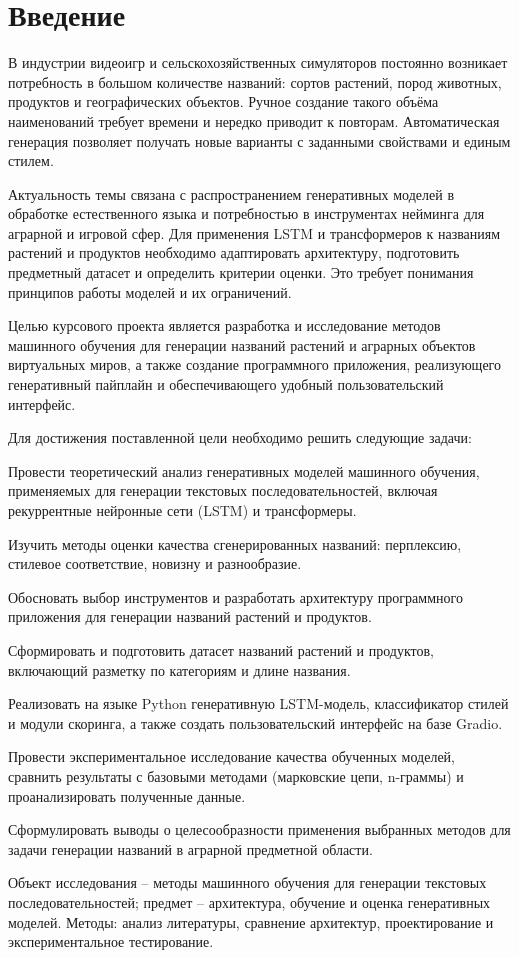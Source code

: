 \chapter*{Введение}\label{ux432ux432ux435ux434ux435ux43dux438ux435}

В индустрии видеоигр и сельскохозяйственных симуляторов постоянно возникает потребность в большом количестве названий: сортов растений, пород животных, продуктов и географических объектов. Ручное создание такого объёма наименований требует времени и нередко приводит к повторам. Автоматическая генерация позволяет получать новые варианты с заданными свойствами и единым стилем.

Актуальность темы связана с распространением генеративных моделей в обработке естественного языка и потребностью в инструментах нейминга для аграрной и игровой сфер. Для применения LSTM и трансформеров к названиям растений и продуктов необходимо адаптировать архитектуру, подготовить предметный датасет и определить критерии оценки. Это требует понимания принципов работы моделей и их ограничений.

Целью курсового проекта является разработка и исследование методов машинного обучения для генерации названий растений и аграрных объектов виртуальных миров, а также создание программного приложения, реализующего генеративный пайплайн и обеспечивающего удобный пользовательский интерфейс.

Для достижения поставленной цели необходимо решить следующие задачи:

Провести теоретический анализ генеративных моделей машинного обучения, применяемых для генерации текстовых последовательностей, включая рекуррентные нейронные сети (LSTM) и трансформеры.

Изучить методы оценки качества сгенерированных названий: перплексию, стилевое соответствие, новизну и разнообразие.

Обосновать выбор инструментов и разработать архитектуру программного приложения для генерации названий растений и продуктов.

Сформировать и подготовить датасет названий растений и продуктов, включающий разметку по категориям и длине названия.

Реализовать на языке Python генеративную LSTM-модель, классификатор стилей и модули скоринга, а также создать пользовательский интерфейс на базе Gradio.

Провести экспериментальное исследование качества обученных моделей, сравнить результаты с базовыми методами (марковские цепи, n-граммы) и проанализировать полученные данные.

Сформулировать выводы о целесообразности применения выбранных методов для задачи генерации названий в аграрной предметной области.

Объект исследования -- методы машинного обучения для генерации текстовых последовательностей; предмет -- архитектура, обучение и оценка генеративных моделей. Методы: анализ литературы, сравнение архитектур, проектирование и экспериментальное тестирование.
